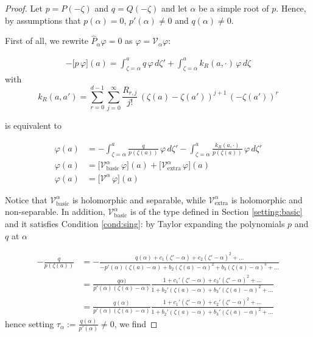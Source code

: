 \documentclass{article}
\theoremstyle{plain}
\newcommand{\volterra}{\mathcal{V}}
\newcommand{\hardpart}{\mathcal{V}_\text{basic}}
\newcommand{\softpart}{\mathcal{V}_\text{extra}}
\begin{document}
\begin{proof}
Let $p = P(-\zeta)$ and $q = Q(-\zeta)$ and let $\alpha$ be a simple root of $p$. Hence, by assumptions that $p(\alpha)=0$, $p'(\alpha)\neq 0$ and $q(\alpha)\neq 0$. 

First of all, we rewrite $\hat{P}_{\alpha}\varphi=0$ as $\varphi = \volterra_\alpha \varphi $: %

\begin{align*}
    -\big[ p\, \varphi \big](a)= \int_{\zeta=\alpha}^a q  \, \varphi \, d\zeta' + \int_{\zeta=\alpha}^a k_R(a,\cdot)  \, \varphi \, d\zeta
\end{align*}
with \[k_R(a,a')=\sum_{r=0}^{d-1}\sum_{j=0}^\infty \frac{R_{r,j}}{j!} \, (\zeta(a)-\zeta(a'))^{j+1} \, (-\zeta(a'))^r\]  

is equivalent to 

\begin{align}
   \nonumber \varphi (a)& =-\int_{\zeta=\alpha}^a \frac{q}{p(\zeta(a))}  \, \varphi \, d\zeta' - \int_{\zeta=\alpha}^a \frac{k_R(a,\cdot)}{p(\zeta(a))}  \, \varphi \, d\zeta' \\
   \nonumber \varphi (a)& =\Big[ \hardpart^\alpha \, \varphi \Big](a)+ \Big[\softpart^\alpha \, \varphi\Big](a) \\
   \varphi(a) &=\Big[ \volterra^\alpha \, \varphi \Big](a)
\end{align}

Notice that $\hardpart^\alpha$ is holomorphic and separable, while $\softpart^\alpha$ is holomorphic and non-separable. In addition, $\hardpart^\alpha$ is of the type defined in Section \ref{setting:basic} and it satisfies Condition \eqref{cond:sing}: by Taylor expanding the polynomials $p$ and $q$ at $\alpha$

\begin{align*}
    -\frac{q}{p(\zeta(a))}&=-\frac{q(\alpha)+c_1(\zeta'-\alpha)+c_2 (\zeta'-\alpha)^2+...}{-p'(\alpha)(\zeta(a)-\alpha)+ b_2 (\zeta(a)-\alpha)^2+b_3(\zeta(a)-\alpha)^3+...}\\
    &=\frac{q\alpha)}{p'(\alpha)(\zeta(a)-\alpha)}\frac{1+c_1'(\zeta'-\alpha)+c_2' (\zeta'-\alpha)^2+...}{1+ b_2' (\zeta(a)-\alpha)+b_3'(\zeta(a)-\alpha)^2+...}\\
    &=\frac{q(\alpha)}{p'(\alpha)(\zeta(a)-\alpha)}\frac{1+c_1'(\zeta'-\alpha)+c_2' (\zeta'-\alpha)^2+...}{1+b_2' (\zeta(a)-\alpha)+b_3'(\zeta(a)-\alpha)^2+...}
\end{align*}
hence setting $\tau_\alpha:=\frac{q(\alpha)}{p'(\alpha)}\neq 0$, we find


\end{proof}
\end{document}
